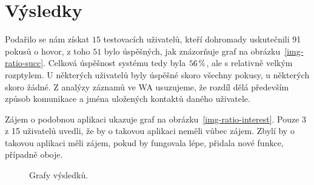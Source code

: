 \section{Výsledky}\label{results}

Podařilo se nám získat \(15\) testovacích uživatelů, kteří dohromady uskutečnili 91
pokusů o hovor, z toho \(51\) bylo úspěšných, jak znázorňuje
graf na obrázku~\ref{img-ratio-succ}. Celková úspěšnost
systému tedy byla \(56\,\rm \%\), ale s relativně velkým rozptylem. U některých uživatelů
byly úspěšné skoro všechny pokusy, u některých skoro žádné. Z analýzy záznamů ve WA usuzujeme,
že rozdíl dělá především způsob komunikace a jména uložených kontaktů daného
uživatele.

Zájem o podobnou aplikaci ukazuje graf na obrázku~\ref{img-ratio-interest}.
Pouze 3 z 15 uživatelů uvedli, že by o takovou aplikaci neměli vůbec zájem.
Zbylí by o takovou aplikaci měli zájem, pokud by fungovala lépe, přidala nové funkce,
případně oboje.


\newsavebox{\tempbox}
\begin{figure}[H]
    \qquad
    \caption{Grafy výsledků.}
\end{figure}

